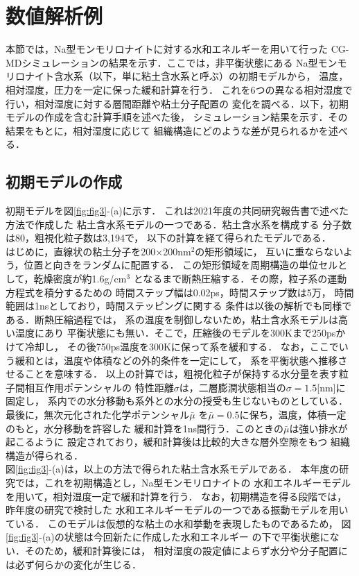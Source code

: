 \section{数値解析例}
本節では，Na型モンモリロナイトに対する水和エネルギーを用いて行った
CG-MDシミュレーションの結果を示す．ここでは，非平衡状態にある
Na型モンモリロナイト含水系（以下，単に粘土含水系と呼ぶ）の初期モデルから，
温度，相対湿度，圧力を一定に保った緩和計算を行う．
これを6つの異なる相対湿度で行い，相対湿度に対する層間距離や粘土分子配置の
変化を調べる．以下，初期モデルの作成を含む計算手順を述べた後，
シミュレーション結果を示す．その結果をもとに，相対湿度に応じて
組織構造にどのような差が見られるかを述べる．
\subsection{初期モデルの作成}
初期モデルを図\ref{fig:fig3}-(a)に示す．
これは2021年度の共同研究報告書で述べた方法で作成した
粘土含水系モデルの一つである．粘土含水系を構成する
分子数は80，粗視化粒子数は3,194で，
以下の計算を経て得られたモデルである．\\
\hspace{\parindent}
はじめに，直線状の粘土分子を200$\times$200nm$^2$の矩形領域に，
互いに重ならないよう，位置と向きをランダムに配置する．
この矩形領域を周期構造の単位セルとして，乾燥密度が約1.6g/cm$^{3}$
となるまで断熱圧縮する．その際，粒子系の運動方程式を積分するための
時間ステップ幅は0.02ps，時間ステップ数は5万，
時間範囲は1nsとしており，時間ステッピングに関する
条件は以後の解析でも同様である．断熱圧縮過程では，
系の温度を制御しないため，粘土含水系モデルは高い温度にあり
平衡状態にも無い．そこで，圧縮後のモデルを300Kまで$250$psかけて冷却し，
その後750ps温度を300Kに保って系を緩和する．
なお，ここでいう緩和とは，温度や体積などの外的条件を一定にして，
系を平衡状態へ推移させることを意味する．
以上の計算では，粗視化粒子が保持する水分量を表す粒子間相互作用ポテンシャルの
特性距離$\sigma$は，二層膨潤状態相当の$\sigma=1.5$[nm]に固定し，
系内での水分移動も系外との水分の授受も生じないものとしている．
最後に，無次元化された化学ポテンシャル$\bar \mu$
を$\bar \mu =0.5$に保ち，温度，体積一定のもと，水分移動を許容した
緩和計算を1ns間行う．このときの$\bar \mu$は強い排水が起こるように
設定されており，緩和計算後は比較的大きな層外空隙をもつ
組織構造が得られる．\\
\hspace{\parindent}
図\ref{fig:fig3}-(a)は，以上の方法で得られた粘土含水系モデルである．
本年度の研究では，これを初期構造とし，Na型モンモリロナイトの
水和エネルギーモデルを用いて，相対湿度一定で緩和計算を行う．
なお，初期構造を得る段階では，昨年度の研究で検討した
水和エネルギーモデルの一つである振動モデルを用いている．
このモデルは仮想的な粘土の水和挙動を表現したものであるため，
図\ref{fig:fig3}-(a)の状態は今回新たに作成した水和エネルギー
の下で平衡状態にない．そのため，緩和計算後には，
相対湿度の設定値によらず水分や分子配置には必ず何らかの変化が生じる．
